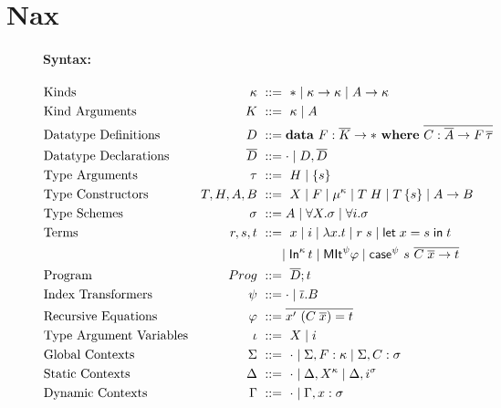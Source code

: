 \section{Nax}
\begin{figure}
\begin{framed}
\paragraph{Syntax:}
\begin{align*}
&\text{Kinds}
	& \kappa	&~ ::= ~ * \mid \kappa -> \kappa \mid A -> \kappa
 \\
&\text{Kind Arguments}
	& K		&~ ::= ~ \kappa \mid A
 \\
&\text{Datatype Definitions}
	& D		&~ ::= \mathbf{data}~ F : \overline{K} -> *
                             ~ \mathbf{where} ~
                               \overline{C : \overline{A} -> F\,\overline{\tau}}
 \\
&\text{Datatype Declarations}
	& \overline{D}	&~ ::= \cdot \mid D,\overline{D}
 \\
&\text{Type Arguments}
	& \tau		&~ ::= ~ H \mid \{s\}
 \\
&\text{Type Constructors}
	& T,H,A,B	&~ ::= ~ X \mid F
			   \mid \mu^\kappa
			   \mid T\;H \mid T\,\{s\}
			   \mid A -> B
 \\
&\text{Type Schemes}
	& \sigma	&~ ::= A
			   \mid \forall X.\sigma
			   \mid \forall i.\sigma
 \\
&\text{Terms}
	& r,s,t		&~ ::= ~ x \mid i
			   \mid \lambda x.t \mid r\;s \mid \mathsf{let}\;x = s\;\mathsf{in}\; t \\
&	&		&~~~~~
			   \mid \mathsf{In}^\kappa\,t
			   \mid \mathsf{MIt}^\psi \varphi 
			   \mid \mathsf{case}^\psi~s~\overline{C\;\overline{x} -> t}
 \\
&\text{Program}
	& Prog		&~ ::= ~ \overline{D};t
 \\
&\text{Index Transformers}
	& \psi		&~ ::= \cdot \mid \overline\iota . B
 \\
&\text{Recursive Equations}
	& \varphi	&~ ::= \overline{x' ~ (C\;\overline{x}) = t}
 \\
&\text{Type Argument Variables}
	& \iota		&~ ::= ~ X \mid i
 \\
&\text{Global Contexts}
	& \Sigma		&~ ::= ~ \cdot
				\mid \Sigma, F: \kappa \mid \Sigma, C: \sigma
 \\
&\text{Static Contexts}
	& \Delta		&~ ::= ~ \cdot
				\mid \Delta, X^\kappa
				\mid \Delta, i^\sigma
 \\
&\text{Dynamic Contexts}
	& \Gamma		&~ ::= ~ \cdot
				\mid \Gamma, x : \sigma
\end{align*}
~\\


\end{framed}
\end{figure}

